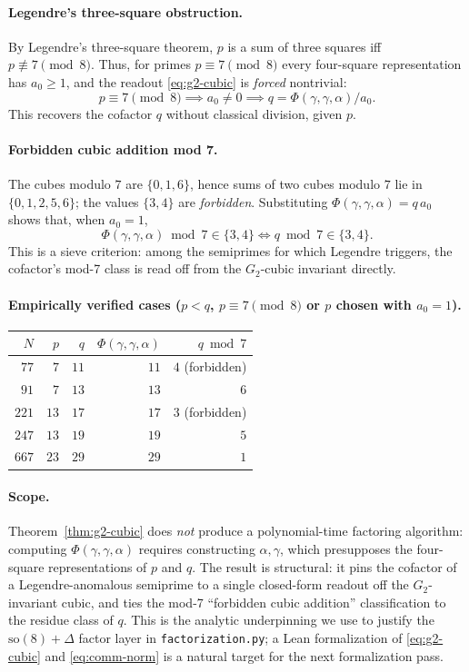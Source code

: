 \documentclass[11pt,a4paper]{article}
\theoremstyle{plain}
\theoremstyle{definition}
\theoremstyle{remark}
\begin{document}
\paragraph{Legendre's three-square obstruction.}
By Legendre's three-square theorem, $p$ is a sum of three squares iff
$p \not\equiv 7 \pmod 8$. Thus, for primes $p \equiv 7 \pmod 8$ every
four-square representation has $a_0 \ge 1$, and the readout \eqref{eq:g2-cubic}
is \emph{forced} nontrivial:
\[
p \equiv 7 \pmod 8 \implies a_0 \neq 0 \implies q = \Phi(\gamma,\gamma,\alpha)/a_0.
\]
This recovers the cofactor $q$ without classical division, given $p$.

\paragraph{Forbidden cubic addition mod 7.}
The cubes modulo $7$ are $\{0,1,6\}$, hence sums of two cubes modulo $7$ lie in
$\{0,1,2,5,6\}$; the values $\{3,4\}$ are \emph{forbidden}. Substituting
$\Phi(\gamma,\gamma,\alpha) = q\,a_0$ shows that, when $a_0 = 1$,
\[
\Phi(\gamma,\gamma,\alpha) \bmod 7 \in \{3, 4\}\iff q \bmod 7 \in \{3, 4\}.
\]
This is a sieve criterion: among the semiprimes for which Legendre triggers,
the cofactor's mod-7 class is read off from the $G_2$-cubic invariant directly.

\paragraph{Empirically verified cases ($p < q$, $p \equiv 7 \pmod 8$ or
$p$ chosen with $a_0 = 1$).}
\begin{center}
\begin{tabular}{rrrrr}
\hline
$N$ & $p$ & $q$ & $\Phi(\gamma,\gamma,\alpha)$ & $q \bmod 7$ \\ \hline
$77$ & $7$ & $11$ & $11$ & $4$ (forbidden) \\
$91$ & $7$ & $13$ & $13$ & $6$ \\
$221$ & $13$ & $17$ & $17$ & $3$ (forbidden) \\
$247$ & $13$ & $19$ & $19$ & $5$ \\
$667$ & $23$ & $29$ & $29$ & $1$ \\ \hline
\end{tabular}
\end{center}

\paragraph{Scope.}
Theorem~\ref{thm:g2-cubic} does \emph{not} produce a polynomial-time factoring
algorithm: computing $\Phi(\gamma,\gamma,\alpha)$ requires constructing $\alpha,
\gamma$, which presupposes the four-square representations of $p$ and $q$. The
result is structural: it pins the cofactor of a Legendre-anomalous semiprime
to a single closed-form readout off the $G_2$-invariant cubic, and ties the
mod-7 ``forbidden cubic addition'' classification to the residue class of $q$.
This is the analytic underpinning we use to justify the $\mathrm{so}(8)+\Delta$
factor layer in \texttt{factorization.py}; a Lean formalization of
\eqref{eq:g2-cubic} and \eqref{eq:comm-norm} is a natural target for the next
formalization pass.
\end{document}
